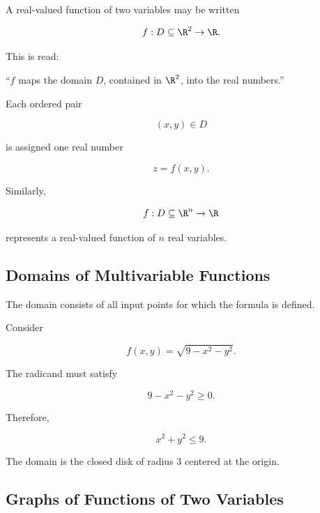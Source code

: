 A real-valued function of two variables may be written

\[ f:D\subseteq\R^2\to\R. \]

This is read:

``\(f\) maps the domain \(D\), contained in \(\R^2\), into the real
numbers.''

Each ordered pair

\[ (x,y)\in D \]

is assigned one real number

\[ z=f(x,y). \]

Similarly,

\[ f:D\subseteq\R^n\to\R \]

represents a real-valued function of \(n\) real variables.

\subsection{Domains of Multivariable Functions}
\label{subsec:multivariable-domains}

The domain consists of all input points for which the formula is defined.

Consider

\[ f(x,y)=\sqrt{9-x^2-y^2}. \]

The radicand must satisfy

\[ 9-x^2-y^2\geq0. \]

Therefore,

\[ x^2+y^2\leq9. \]

The domain is the closed disk of radius \(3\) centered at the origin.

\begin{center}
\end{center}

\subsection{Graphs of Functions of Two Variables}
\label{subsec:graphs-two-variable-functions}


